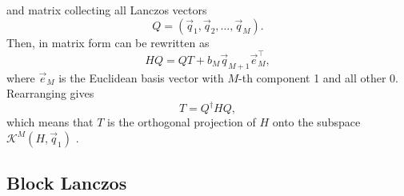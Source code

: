 and matrix collecting all Lanczos vectors
\begin{equation}
    Q = (\vec{q}_1, \vec{q}_2, \ldots, \vec{q}_M).
\end{equation}
Then,  in matrix form can be rewritten as
\begin{equation}
    H Q = Q T + b_{M}\vec{q}_{M+1}\vec{e}_{M}^\top,
\end{equation}
where $\vec{e}_M$ is the Euclidean basis vector with $M$-th component 1 and all other 0.
Rearranging gives
\begin{equation}
    T = Q^\dag H Q,
\end{equation}
which means that $T$ is the orthogonal projection of $H$ onto
the subspace $\mathcal{K}^M(H, \vec{q}_1)$ \cite{Cullum1985}.

\subsection{Block Lanczos}


